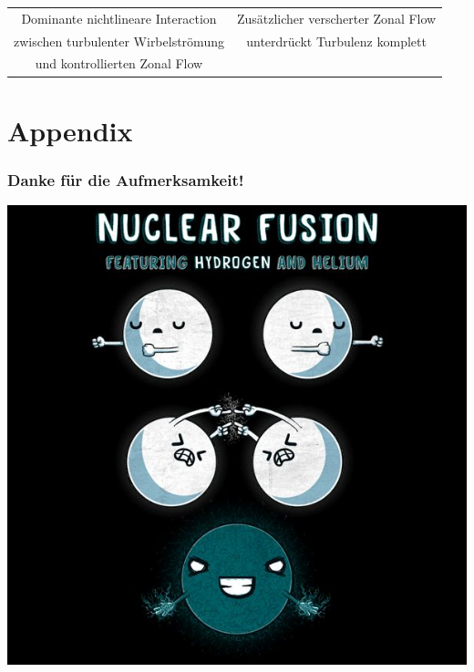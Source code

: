 \documentclass[compress,aspectratio=1610]{beamer}
\begin{document}
\begin{frame}
\begin{tabular}{c c}
			Dominante nichtlineare Interaction  & Zusätzlicher verscherter Zonal Flow \\
			zwischen turbulenter Wirbelströmung & unterdrückt Turbulenz komplett \\
			und kontrollierten Zonal Flow & \\
		\end{tabular}
	\end{frame}


	\appendix
	\section*{Appendix}
	\begin{frame}
		\frametitle{Danke für die Aufmerksamkeit!}
		\includegraphics[scale = 0.3]{Presentation/Fusion_Meme.jpeg} \\
	\end{frame}
\end{document}
